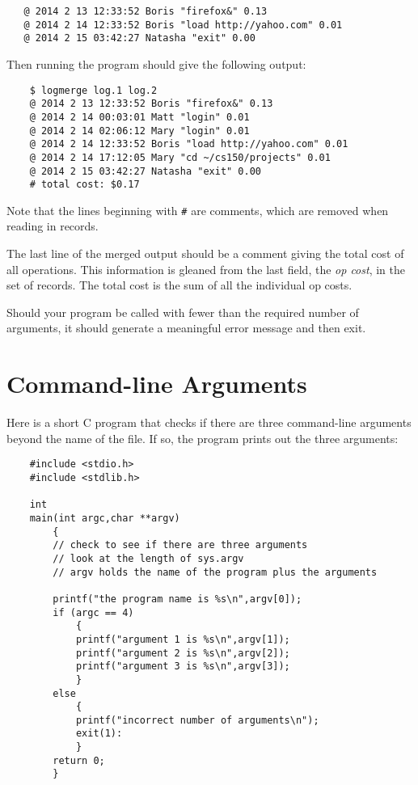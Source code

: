 \documentclass{article}
\begin{document}
\begin{verbatim}
   @ 2014 2 13 12:33:52 Boris "firefox&" 0.13
   @ 2014 2 14 12:33:52 Boris "load http://yahoo.com" 0.01
   @ 2014 2 15 03:42:27 Natasha "exit" 0.00
\end{verbatim}

Then running the program should give the following output:

\begin{verbatim}
    $ logmerge log.1 log.2
    @ 2014 2 13 12:33:52 Boris "firefox&" 0.13
    @ 2014 2 14 00:03:01 Matt "login" 0.01
    @ 2014 2 14 02:06:12 Mary "login" 0.01
    @ 2014 2 14 12:33:52 Boris "load http://yahoo.com" 0.01
    @ 2014 2 14 17:12:05 Mary "cd ~/cs150/projects" 0.01
    @ 2014 2 15 03:42:27 Natasha "exit" 0.00
    # total cost: $0.17
\end{verbatim}

Note that the lines beginning with \verb!#! are comments, which are
removed when reading in records.

The last line of the merged output should be a comment
giving the total cost
of all operations. This information is gleaned from the
last field, the {\it op cost}, in the set of records.
The total cost is the sum of
all the individual op costs.

Should your program be called with fewer than the required number
of arguments, it should generate a meaningful error message and then
exit.

\section*{Command-line Arguments}

Here is a short C program that checks if there are three 
command-line arguments beyond the name of the file.
If so, the program prints out the three arguments:

\begin{verbatim}
    #include <stdio.h>
    #include <stdlib.h>

    int
    main(int argc,char **argv)
        {
        // check to see if there are three arguments
        // look at the length of sys.argv
        // argv holds the name of the program plus the arguments

        printf("the program name is %s\n",argv[0]);
        if (argc == 4)
            {
            printf("argument 1 is %s\n",argv[1]);
            printf("argument 2 is %s\n",argv[2]);
            printf("argument 3 is %s\n",argv[3]);
            }
        else
            {
            printf("incorrect number of arguments\n");
            exit(1):
            }
        return 0;
        }
\end{verbatim}
\end{document}
